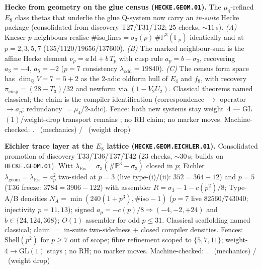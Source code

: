 \par\smallskip\noindent\textbf{Hecke from geometry on the glue census
(\texttt{HECKE.GEOM.01}).}
The $\mu_4$-refined $E_8$ class thetas that underlie the glue Q-system now carry an
\emph{in-suite} Hecke package (consolidated from discovery T27/T31/T32; $25$ checks,
$\sim11$\,s).
\emph{(A)} Kneser $p$-neighbours realise
$\#\mathrm{iso\_lines}=\sigma_3(p)\,\#\mathbb P^3(\mathbb F_p)$ identically and at
$p=2,3,5,7$ ($135/1120/19656/137600$).
\emph{(B)} The marked neighbour-sum is the affine Hecke element
$\nu_p=a\,\mathrm{Id}+b\,T_p$ with cusp rule $a_p=b-\sigma_3$, recovering
$a_3=-4$, $a_5=-2$ ($p=7$ consistency $\lambda_{\mathrm{odd}}=19840$).
\emph{(C)} The census form space has $\dim_{\mathbb Q}V=7=5{+}2$ as the $2$-adic oldform
hull of $E_4$ and $f_8$, with recovery $\pi_{\mathrm{cusp}}=(28-T_3)/32$ and newform via
$(1-V_2U_2)$. Classical theorems named classical; the claim is the compiler identification
(correspondence $\to$ operator $\to a_p$; redundancy $=\mu_4$/$2$-adic). Fence: both new
systems stay weight~$4$ --- GL$(1)$/weight-drop transport remains \mO; no RH claim; no
marker moves. Machine-checked: .
\mE\ (mechanics) / \mO\ (weight drop)


\par\smallskip\noindent\textbf{Eichler trace layer at the $E_8$ lattice
(\texttt{HECKE.GEOM.EICHLER.01}).}
Consolidated promotion of discovery T33/T36/T37/T42 ($23$ checks, $\sim30$\,s; builds on
\texttt{HECKE.GEOM.01}). Witt $\lambda_{\mathrm{Eis}}=\sigma_3(\#\mathbb P^3-\sigma_3)$ closed
in $p$; Eichler $\lambda_{\mathrm{geom}}=\lambda_{\mathrm{Eis}}+a_p^2$ two-sided at $p=3$
(live type-(i)/(ii): $352=364-12$) and $p=5$ (T36 freeze: $3784=3906-122$) with assembler
$R=\sigma_3-1-c(p^2)/8$; Type-A/B densities
$N_A=\min(240(1+p^3),\#\mathrm{iso}-1)$ ($p=7$ live $82560/743040$; injectivity $p=11,13$);
signed $a_p=-c(p)/8\Rightarrow(-4,-2,+24)$ and $b\in\{24,124,368\}$; $O(1)$ assembler for odd
$p\le31$. Classical scaffolding named classical; claim $=$ in-suite two-sidedness $+$ closed
compiler densities. Fences: $\mathrm{Shell}(p^2)$ for $p\ge7$ out of scope; fibre refinement
scoped to $\{5,7,11\}$; weight-$4\to$GL$(1)$ stays \mO; no RH; no marker moves.
Machine-checked: .
\mE\ (mechanics) / \mO\ (weight drop)


